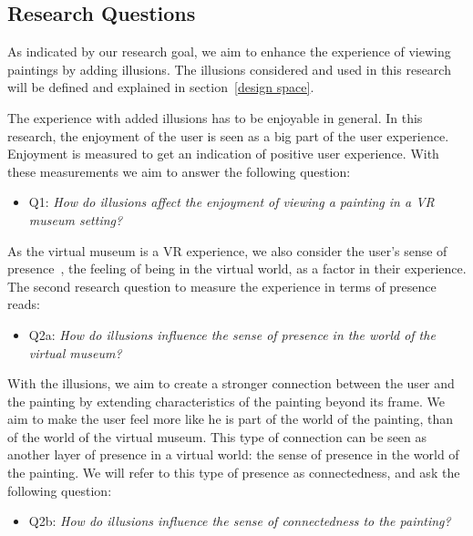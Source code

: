 \documentclass[a4paper]{article}
\begin{document}
\subsection {Research Questions}

As indicated by our research goal, we aim to enhance the experience of viewing paintings by adding illusions. The illusions considered and used in this research will be defined and explained in section~\ref{design space}. 

The experience with added illusions has to be enjoyable in general. In this research, the enjoyment of the user is seen as a big part of the user experience. Enjoyment is measured to get an indication of positive user experience. With these measurements we aim to answer the following question:
\begin{itemize}
\item{Q1: \emph{How do illusions affect the enjoyment of viewing a painting in a VR museum setting?}}
\end{itemize}  

As the virtual museum is a VR experience, we also consider the user's sense of presence~\cite{witmer}, the feeling of being in the virtual world, as a factor in their experience. The second research question to measure the experience in terms of presence reads:
\begin{itemize}
\item{Q2a: \emph{How do illusions influence the sense of presence in the world of the virtual museum?}}
\end{itemize} %

With the illusions, we aim to create a stronger connection between the user and the painting by extending characteristics of the painting beyond its frame. We aim to make the user feel more like he is part of the world of the painting, than of the world of the virtual museum. This type of connection can be seen as another layer of presence in a virtual world: the sense of presence in the world of the painting. We will refer to this type of presence as connectedness, and ask the following question:

\begin{itemize}
\item{Q2b: \emph{How do illusions influence the sense of connectedness to the painting?}}
\end{itemize}
\end{document}
